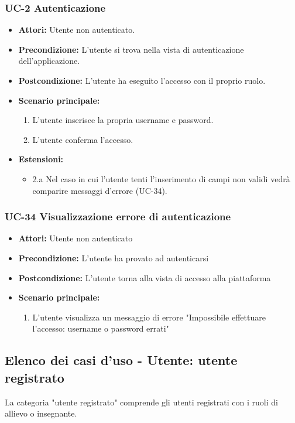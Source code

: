 \subsubsection{UC-2 Autenticazione}
		\begin{itemize}
			\item \textbf{Attori:} Utente non autenticato.
			\item \textbf{Precondizione:} L'utente si trova nella vista di autenticazione dell'applicazione.
			\item \textbf{Postcondizione:} L'utente ha eseguito l'accesso con il proprio ruolo.
			\item \textbf{Scenario principale:}
				\begin{enumerate}
					\item L'utente inserisce la propria username e password.
					\item L'utente conferma l'accesso.
				\end{enumerate}
				\item \textbf{Estensioni:}
				\begin{itemize}
					\item 2.a Nel caso in cui l'utente tenti l'inserimento di campi non validi vedrà comparire messaggi d'errore (UC-34).
				\end{itemize}
		\end{itemize}
		
\subsubsection{UC-34 Visualizzazione errore di autenticazione}
		\begin{itemize}
			\item \textbf{Attori:} Utente non autenticato
			\item \textbf{Precondizione:} L'utente ha provato ad autenticarsi
			\item \textbf{Postcondizione:} L'utente torna alla vista di accesso alla piattaforma
			\item \textbf{Scenario principale:}
			\begin{enumerate}
				\item L'utente visualizza un messaggio di errore "Impossibile effettuare l'accesso: username o password errati"
			\end{enumerate}
		\end{itemize}
		
\subsection{Elenco dei casi d'uso - Utente: utente registrato}	
La categoria "utente registrato" comprende gli utenti registrati con i ruoli di allievo o insegnante.	
